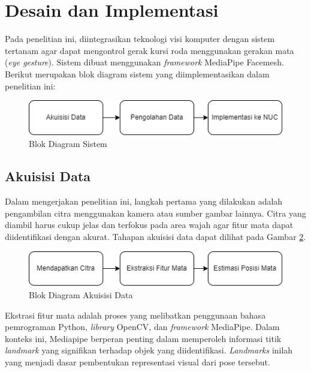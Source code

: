 \section{Desain dan Implementasi}
\label{sec:desaindanimplementasi}

Pada penelitian ini, diintegrasikan teknologi visi komputer dengan sistem tertanam agar dapat mengontrol gerak kursi roda menggunakan gerakan mata (\emph{eye gesture}). Sistem dibuat menggunakan \emph{framework} MediaPipe Facemesh. Berikut merupakan blok diagram sistem yang diimplementasikan dalam penelitian ini:

\begin{figure} [ht] \centering
  \includegraphics[scale=0.55]{gambar/paper1.png}
  \caption{Blok Diagram Sistem}
  \label{fig:sistem}
\end{figure}

\subsection{Akuisisi Data}

Dalam mengerjakan penelitian ini, langkah pertama yang dilakukan adalah pengambilan citra menggunakan kamera atau sumber gambar lainnya. Citra yang diambil harus cukup jelas dan terfokus pada area wajah agar fitur mata dapat diidentifikasi dengan akurat. Tahapan akuisisi data dapat dilihat pada Gambar \ref{fig:akuisisi}.

\begin{figure} [ht] \centering
  \includegraphics[scale=0.55]{gambar/paper2.png}
  \caption{Blok Diagram Akuisisi Data}
  \label{fig:akuisisi}
\end{figure}

Ekstrasi fitur mata adalah proses yang melibatkan penggunaan bahasa pemrograman Python, \emph{library} OpenCV, dan \emph{framework} MediaPipe. Dalam konteks ini, Mediapipe berperan penting dalam memperoleh informasi titik \emph{landmark} yang signifikan terhadap objek yang diidentifikasi. \emph{Landmarks} inilah yang menjadi dasar pembentukan representasi visual dari pose tersebut.

